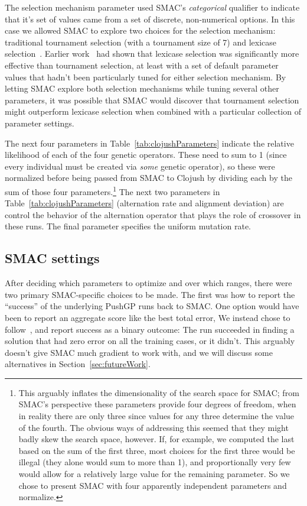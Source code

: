 The selection mechanism parameter used SMAC's \emph{categorical} qualifier to
indicate that it's set of values came from a set of discrete, non-numerical
options. In this case we allowed SMAC to explore two choices for the selection
mechanism: traditional tournament selection (with a tournament size of 7) and
lexicase selection~\cite{Helmuth:2014:ieeeTEC, Spector:2012:GECCOcompANEW}. Earlier 
work~\cite{Helmuth:2015:GECCO} had shown that lexicase selection was
significantly more effective than tournament selection, at least with a set of 
default parameter values that hadn't been particularly tuned for either
selection mechanism. By letting SMAC explore both selection mechanisms while
tuning several other parameters, it was possible that SMAC would discover
that tournament selection might outperform lexicase selection when combined
with a particular collection of parameter settings.

The next four parameters in Table~\ref{tab:clojushParameters} indicate the
relative likelihood of each of the four genetic operators. These need to sum
to 1 (since every individual must be created via \emph{some} genetic operator),
so these were normalized before being passed from SMAC to Clojush by dividing
each by the sum of those four parameters.\footnote{This arguably inflates the dimensionality of the
search space for SMAC; from SMAC's perspective these parameters provide four
degrees of freedom, when in reality there are only three since values for any
three determine the value of the fourth. The obvious ways of addressing this
seemed that they might badly skew the search space, however. If, for example,
we computed the last based on the sum of the first three, most choices for the
first three would be illegal (they alone would sum to more than 1), and
proportionally very few would allow for a relatively large value for the
remaining parameter. So we chose to present SMAC with four apparently 
independent parameters and normalize.} The next two parameters in Table~\ref{tab:clojushParameters} (alternation
rate and alignment deviation) are control the behavior of the alternation
operator that plays the role of crossover in these runs. The final parameter
specifies the uniform mutation rate.

\subsection{SMAC settings}
\label{sec:SMACsettings}

After deciding which parameters to optimize and over which ranges, there 
were two primary SMAC-specific choices to be made. The first was how to
report the ``success'' of the underlying PushGP runs back to SMAC. One
option would have been to report an aggregate score like the best total error,
We instead chose to 
follow~\cite{Helmuth:2015:GECCO,Helmuth:2014:ieeeTEC}, and report
success as a binary outcome: The run succeeded in finding a solution that
had zero error on all the training cases, or it didn't. This arguably doesn't
give SMAC much gradient to work with, and we will discuss some alternatives
in Section~\ref{sec:futureWork}.

